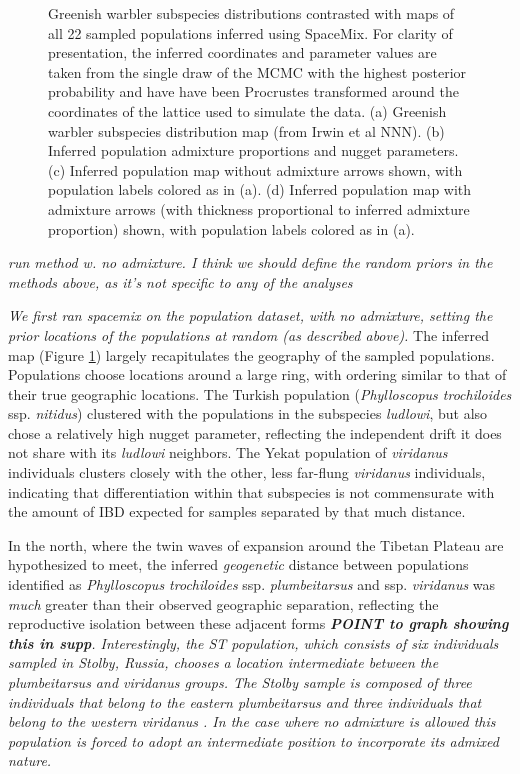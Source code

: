 \documentclass[12pt]{article}
\newcommand{\gc}[1]{{\em \color{blue} #1}}
\begin{document}
\begin{figure}
	\caption{Greenish warbler subspecies distributions contrasted with maps of all 22 sampled populations inferred using SpaceMix.  For clarity of presentation, the inferred coordinates and parameter values are taken from the single draw of the MCMC with the highest posterior probability and have have been Procrustes transformed around the coordinates of the lattice used to simulate the data. (a) Greenish warbler subspecies distribution map (from Irwin et al NNN).  (b) Inferred population admixture proportions and nugget parameters. (c) Inferred population map without admixture arrows shown, with population labels colored as in (a). (d) Inferred population map with admixture arrows (with thickness proportional to inferred admixture proportion) shown, with population labels colored as in (a). }\label{sfig:warbler_pops}
\end{figure}

\gc{run method w. no admixture. I think we should define the random priors in the methods above, as it's not specific to any of the analyses}

\gc{We first ran spacemix on the population dataset, with no admixture, setting the prior locations of the populations at random (as described above).} The inferred map (Figure \ref{sfig:warbler_pops}) largely recapitulates the geography of the sampled populations.  Populations choose locations around a large ring, with ordering similar to that of their true geographic locations.  The Turkish population (\textit{Phylloscopus trochiloides} ssp. \textit{nitidus}) clustered with the populations in the subspecies \textit{ludlowi}, but also chose a relatively high nugget parameter, reflecting the independent drift it does not share with its \textit{ludlowi} neighbors.  The Yekat population of \textit{viridanus} individuals clusters closely with the other, less far-flung \textit{viridanus} individuals, indicating that differentiation within that subspecies is not commensurate with the amount of IBD expected for samples separated by that much distance. 

In the north, where the twin waves of expansion around the Tibetan Plateau are hypothesized to meet, the inferred \gc{geogenetic} distance between populations identified as \textit{Phylloscopus trochiloides} ssp. \textit{plumbeitarsus} and ssp. \textit{viridanus} was \gc{much} greater than their observed geographic separation, reflecting the reproductive isolation between these adjacent forms \gc{{\bf POINT to graph showing this in supp}.  Interestingly, the ST population, which consists of six individuals sampled in Stolby, Russia, chooses a location intermediate between the \textit{plumbeitarsus} and \textit{viridanus} groups. The Stolby sample is composed of three individuals that belong to the eastern \textit{plumbeitarsus} and three individuals that belong to the western \textit{viridanus} \cite{Alcaide et al (2014)}. In the case where no admixture is allowed this population is forced to adopt an intermediate position to incorporate its admixed nature. }
\end{document}
